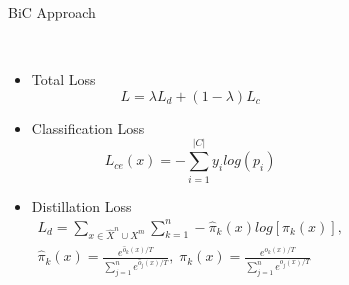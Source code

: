 \documentclass[aspectratio=169, xcolor=dvipsnames]{beamer}
\begin{document}
\begin{frame}{BiC Approach}
      \framesubtitle{}%
      
      \vspace{-0.75cm}
      \begin{columns}
      \begin{itemize}
      \item Total Loss\\
      \vspace{-0.5cm}
            {\small
            \begin{equation}
            L = \lambda L_d + (1 - \lambda) L_c
            \end{equation}
            }
      \item Classification Loss\\
      \vspace{-0.5cm}
            {\small
            \begin{equation}
            L_{ce}(x) = - \sum^{|C|}_{i=1} y_i log (p_i)
            \end{equation}
            }
      \item Distillation Loss\\
      \vspace{-0.75cm}
            {\small
            \begin{equation}
            \begin{split}
            L_d = \sum_{x\in{\hat{X}^n} \cup X^m} \sum^n_{k=1} -\hat{\pi}_k (x) log[\pi_k (x)],\\
            \hat{\pi}_k (x) = \frac{e^{\hat{o}_k (x)/T}}{\sum^n_{j=1}e^{\hat{o}_j (x)/T}}, \; \pi_k (x) = \frac{e^{o_k (x)/T}}{\sum^n_{j=1}e^{o_j (x)/T}}
            \end{split}
            \end{equation}
            }
      \end{itemize}
      

\end{columns}
\end{frame}
\end{document}
